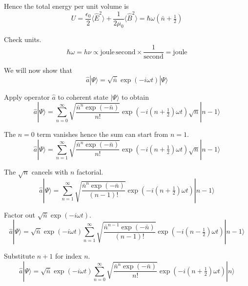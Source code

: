\documentclass[12pt]{article}
\begin{document}
Hence the total energy per unit volume is
\begin{equation*}
U=\frac{\epsilon_0}{2}\langle\hat E^2\rangle
+\frac{1}{2\mu_0}\langle\hat B^2\rangle
=\hbar\omega\left(\bar n+\tfrac{1}{2}\right)
\end{equation*}

Check units.
\begin{equation*}
\hbar\omega=h\nu\propto\text{joule}\,\text{second}\times\frac{1}{\text{second}}=\text{joule}
\end{equation*}

We will now show that
\begin{equation*}
\hat a|\Psi\rangle=\sqrt{\bar n}\exp(-i\omega t)|\Psi\rangle
\end{equation*}

Apply operator $\hat a$ to coherent state $|\Psi\rangle$ to obtain
\begin{equation*}
\hat a|\Psi\rangle
=\sum_{n=0}^\infty
\sqrt{\frac{\bar n^n\exp(-\bar n)}{n!}}
\exp\left(-i\left(n+\tfrac{1}{2}\right)\omega t\right)
\sqrt n|n-1\rangle
\end{equation*}

The $n=0$ term vanishes hence the sum can start from $n=1$.
\begin{equation*}
\hat a|\Psi\rangle
=\sum_{n=1}^\infty
\sqrt{\frac{\bar n^n\exp(-\bar n)}{n!}}
\exp\left(-i\left(n+\tfrac{1}{2}\right)\omega t\right)
\sqrt n|n-1\rangle
\end{equation*}

The $\sqrt n$ cancels with $n$ factorial.
\begin{equation*}
\hat a|\Psi\rangle
=\sum_{n=1}^\infty
\sqrt{\frac{\bar n^n\exp(-\bar n)}{(n-1)!}}
\exp\left(-i\left(n+\tfrac{1}{2}\right)\omega t\right)
|n-1\rangle
\end{equation*}

Factor out $\sqrt{\bar n}\exp(-i\omega t)$.
\begin{equation*}
\hat a|\Psi\rangle
=\sqrt{\bar n}\exp(-i\omega t)
\sum_{n=1}^\infty
\sqrt{\frac{\bar n^{n-1}\exp(-\bar n)}{(n-1)!}}
\exp\left(-i\left(n-\tfrac{1}{2}\right)\omega t\right)
|n-1\rangle
\end{equation*}

Substitute $n+1$ for index $n$.
\begin{equation*}
\hat a|\Psi\rangle
=\sqrt{\bar n}\exp(-i\omega t)
\sum_{n=0}^\infty
\sqrt{\frac{\bar n^n\exp(-\bar n)}{n!}}
\exp\left(-i\left(n+\tfrac{1}{2}\right)\omega t\right)
|n\rangle
\end{equation*}
\end{document}
